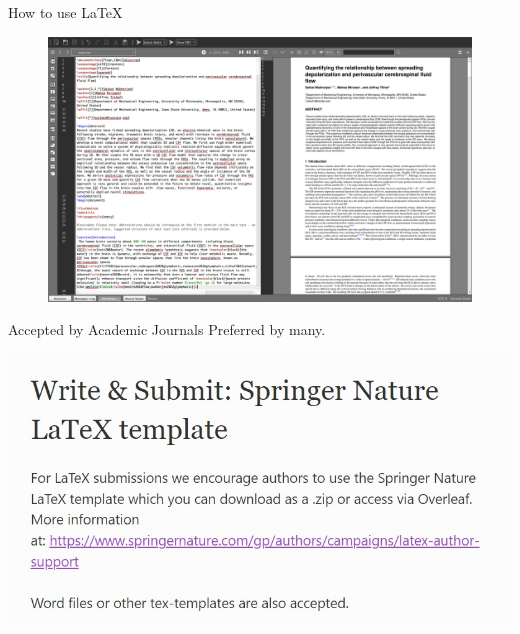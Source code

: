 \documentclass{beamer}
\begin{document}
\begin{frame}[fragile]{How to use \LaTeX{}}
 \begin{figure}
    \centering
    \includegraphics[width=0.8\linewidth]{latex_example.png}
    \label{fig:enter-label}
\end{figure}   

\end{frame}

\begin{frame}{Accepted by Academic Journals}
    Preferred by many.
    \begin{example}
        \includegraphics[width=0.5\linewidth]{nature.jpg}
    \end{example}

\end{frame}
\end{document}

